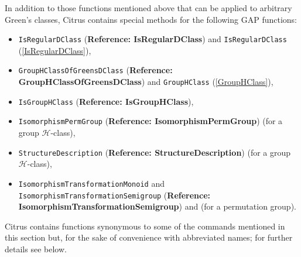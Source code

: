 \documentclass[a4paper,11pt]{report}
\begin{document}
{{ In addition to those functions mentioned above that can be applied to
arbitrary Green's classes, \textsf{Citrus} contains special methods for the following \textsf{GAP} functions: 
\begin{itemize}
\item \texttt{IsRegularDClass} (\textbf{Reference: IsRegularDClass}) and \texttt{IsRegularDClass} (\ref{IsRegularDClass}),
\item \texttt{GroupHClassOfGreensDClass} (\textbf{Reference: GroupHClassOfGreensDClass}) and \texttt{GroupHClass} (\ref{GroupHClass}),
\item \texttt{IsGroupHClass} (\textbf{Reference: IsGroupHClass}),
\item \texttt{IsomorphismPermGroup} (\textbf{Reference: IsomorphismPermGroup}) (for a group $\mathcal{H}$-class),
\item \texttt{StructureDescription} (\textbf{Reference: StructureDescription}) (for a group $\mathcal{H}$-class),
\item \texttt{IsomorphismTransformationMonoid} and \texttt{IsomorphismTransformationSemigroup} (\textbf{Reference: IsomorphismTransformationSemigroup}) and (for a permutation group).
\end{itemize}
 

 \textsf{Citrus} contains functions synonymous to some of the commands mentioned in this
section but, for the sake of convenience with abbreviated names; for further
details see below. }

 }

 
\end{document}
